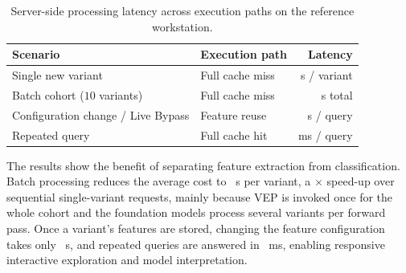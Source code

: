 \begin{table}[htbp]
    \centering
    \caption{Server-side processing latency across execution paths on the reference workstation.}
    \label{tab:latency_benchmarks}
    \begin{tabular}{llr}
        \toprule
        \textbf{Scenario} & \textbf{Execution path} & \textbf{Latency} \\
        \midrule
        Single new variant & Full cache miss & \tbd{} s / variant \\
        Batch cohort ($10$ variants) & Full cache miss & \tbd{} s total \\
        Configuration change / Live Bypass & Feature reuse & \tbd{} s / query \\
        Repeated query & Full cache hit & \tbd{} ms / query \\
        \bottomrule
    \end{tabular}
\end{table}

The results show the benefit of separating feature extraction from classification. Batch processing reduces the average cost to \tbd{}~s per variant, a \tbd{}$\times$ speed-up over sequential single-variant requests, mainly because VEP is invoked once for the whole cohort and the foundation models process several variants per forward pass. Once a variant's features are stored, changing the feature configuration takes only \tbd{}~s, and repeated queries are answered in \tbd{}~ms, enabling responsive interactive exploration and model interpretation.

